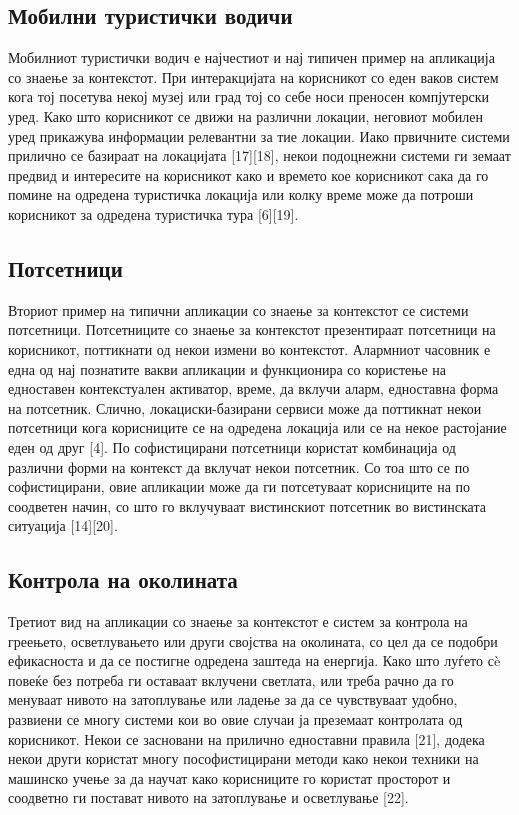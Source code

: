 \subsection{Мобилни туристички водичи}

Мобилниот туристички водич е најчестиот и нај типичен пример на апликација со
знаење за контекстот. При интеракцијата на корисникот со еден ваков систем кога
тој посетува некој музеј или град тој со себе носи преносен компјутерски уред.
Како што корисникот се движи на различни локации, неговиот мобилен уред
прикажува информации релевантни за тие локации. Иако првичните системи прилично
се базираат на локацијата [17][18], некои подоцнежни системи ги земаат предвид и
интересите на корисникот како и времето кое корисникот сака да го помине на
одредена туристичка локација или колку време може да потроши корисникот за
одредена туристичка тура [6][19].

\subsection{Потсетници} 

Вториот пример на типични апликации со знаење за контекстот се системи
потсетници. Потсетниците со знаење за контекстот презентираат потсетници на
корисникот, поттикнати од некои измени во контекстот. Алармниот часовник е една
од нај познатите вакви апликации и функционира со користење на едноставен
контекстуален активатор, време, да вклучи аларм, едноставна форма на потсетник.
Слично, локациски-базирани сервиси може да поттикнат некои потсетници кога
корисниците се на одредена локација или се на некое растојание еден од друг [4].
По софистицирани потсетници користат комбинација од различни форми на контекст
да вклучат некои потсетник. Со тоа што се по софистицирани, овие апликации може
да ги потсетуваат корисниците на по соодветен начин, со што го вклучуваат
вистинскиот потсетник во вистинската ситуација [14][20].

\subsection{Контрола на околината} 

Третиот вид на апликации со знаење за контекстот е систем за контрола на
греењето, осветлувањето или други својства на околината, со цел да се подобри
ефикасноста и да се постигне одредена заштеда на енергија. Како што луѓето сè
повеќе без потреба ги оставаат вклучени светлата, или треба рачно да го менуваат
нивото на затоплување или ладење за да се чувствуваат удобно, развиени се многу
системи кои во овие случаи ја преземаат контролата од корисникот. Некои се
засновани на прилично едноставни правила [21], додека некои други користат многу
пософистицирани методи како некои техники на машинско учење за да научат како
корисниците го користат просторот и соодветно ги постават нивото на затоплување
и осветлување [22].


